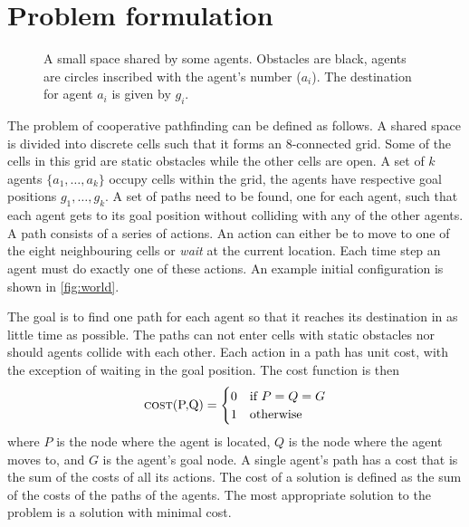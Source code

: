 \section{Problem formulation}\label{sec:problem}

\begin{figure}[t]
    \centering
    \def\svgscale{.7}
    
    \caption{A small space shared by some agents. Obstacles are black, agents
        are circles inscribed with the agent's number ($a_i$). The destination
        for agent $a_i$ is given by $g_i$.}
    \label{fig:world}
\end{figure}

The problem of cooperative pathfinding can be defined as follows. A shared
space is divided into discrete cells such that it forms an 8-connected grid.
Some of the cells in this grid are static obstacles while the other cells are
open. A set of $k$ agents $\{a_1, \ldots, a_k\}$ occupy cells within the grid,
the agents have respective goal positions $g_1, \ldots, g_k$. A set of paths
need to be found, one for each agent, such that each agent gets to its goal
position without colliding with any of the other agents. A path consists of a
series of actions. An action can either be to move to one of the eight
neighbouring cells or \emph{wait} at the current location. Each time step an
agent must do exactly one of these actions. An example initial configuration is
shown in \autoref{fig:world}.

The goal is to find one path for each agent so that it reaches its destination 
in as little time as possible. The paths can not enter cells with static 
obstacles nor should agents collide with each other. Each action in a path has 
unit cost, with the exception of waiting in the goal position. The cost 
function is then
\[
\text{\textsc{cost}(P,Q)} =
\begin{cases}
    0 & \text{if } P = Q = G \\
    1 & \text{otherwise}
\end{cases}
\]
where $P$ is the node where the agent is located, $Q$ is the node where the
agent moves to, and $G$ is the agent's goal node. A single agent's path has a
cost that is the sum of the costs of all its actions. The cost of a solution is
defined as the sum of the costs of the paths of the agents. The most
appropriate solution to the problem is a solution with minimal cost.

